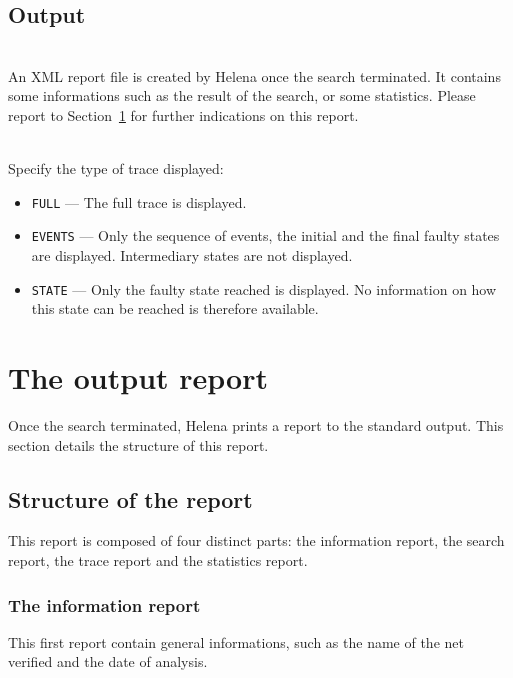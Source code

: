 \subsection{Output}
\begin{description}
\item{}\\ An XML report
  file is created by Helena once the search terminated.  It contains
  some informations such as the result of the search, or some
  statistics.  Please report to Section~\ref{section_output_report}
  for further indications on this report.
\item{}\\ Specify the type of trace
  displayed:
\begin{itemize}
\item\texttt{FULL} --- The full trace is displayed.
\item\texttt{EVENTS} --- Only the sequence of events, the initial and
  the final faulty states are displayed.  Intermediary states are not
  displayed.
\item\texttt{STATE} --- Only the faulty state reached is displayed.  No
  information on how this state can be reached is therefore available.
\end{itemize}
\end{description}
\section{The output report}
\label{section_output_report}
Once the search terminated, Helena prints a report to the standard
output.  This section details the structure of this report.

\subsection{Structure of the report}
This report is composed of four distinct parts: the information report, the
search report, the trace report and the statistics report.

\subsubsection{The information report}
This first report contain general informations, such as the name of the net
verified and the date of analysis.

